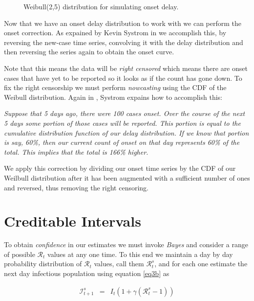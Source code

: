 \documentclass[11pt]{article}
\begin{document}
\begin{figure}[H]
\begin{center}
\end{center}
\caption{Weibull(2,5) distribution for simulating onset delay.}  
\label{fig_weibull}
\end{figure}

Now that we have an onset delay distribution to work with we can perform the onset correction.
As expained by Kevin Systrom in \cite{systrom} we accomplish this, by reversing the new-case time series, 
convolving it with the delay distribution and then reversing the series again to obtain the onset curve. 

Note that this means the data will be {\it right censored} which means there are onset cases
that have yet to be reported so it looks as if the count has gone down.
To fix the right censorship we must perform {\it nowcasting} using the CDF
of the Weibull distribution. Again in \cite{systrom}, Systrom expains how to
accomplish this:

{\it Suppose that 5 days ago, there were 100 cases onset. Over the course of the next 5 days some portion of those cases will be reported. This portion is equal to the cumulative distribution function of our delay distribution. If we know that portion is say, 60\%, then our current count of onset on that day represents 60\% of the total. This implies that the total is 166\% higher. }

We apply this correction by dividing our onset time series by the CDF of our Weilbull distribution after it has been 
augmented with a sufficient number of ones and reversed, thus removing the right censoring.

\section{Creditable Intervals}

To obtain {\em confidence} in our estimates we must invoke {\em Bayes} and consider a range of possible
$\mathcal{R}_t$ values at any one time. To this end we maintain a day by day probability distribution of
$\mathcal{R}_t$ values, call them  $\mathcal{R}_t^s$, and for each one estimate the next day
infectious population using equation \ref{eq3b} as

\begin{eqnarray}
\mathcal{I}_{t+1}^s & = & I_t ( 1 +\gamma  ( \mathcal{R}_t ^s - 1 )  ) \label{eq8} 
\end{eqnarray}
\end{document}

